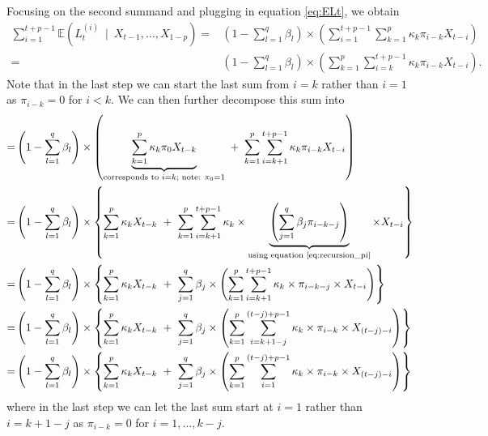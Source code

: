 \documentclass{article}
\begin{document}
Focusing on the second summand and plugging in equation \eqref{eq:ELt}, we obtain
\begin{align*}
\sum_{i = 1}^{t + p - 1}\mathbb{E}(L^{(i)}_t \ \mid \ X_{t - 1}, \dots, X_{1 - p}) = & \left(1 - \sum_{l = 1}^q \beta_l\right) \times \left( \sum_{i = 1}^{t + p - 1} \sum_{k = 1}^p \kappa_k \pi_{i - k} X_{t - i}\right)\\
= & \left(1 - \sum_{l = 1}^q \beta_l\right) \times \left(\sum_{k = 1}^p \sum_{i = k}^{t + p - 1} \kappa_k \pi_{i - k} X_{t - i}\right).
\end{align*}
Note that in the last step we can start the last sum from $i = k$ rather than $i = 1$ as $\pi_{i - k} = 0$ for $i < k$. We can then further decompose this sum into
\begin{align}
= & \left(1 - \sum_{l = 1}^q \beta_l\right) \times \left(\underbrace{\sum_{k = 1}^p \kappa_k \pi_0 X_{t - k}}_{\text{corresponds to } i = k; \text{ note: } \pi_0 = 1} \ + \ \sum_{k = 1}^p \sum_{i = k + 1}^{t + p - 1} \kappa_k \pi_{i - k} X_{t - i}\right)\nonumber\\
= & \left(1 - \sum_{l = 1}^q \beta_l\right) \times \left\{\sum_{k = 1}^p \kappa_k X_{t - k} \ + \ \sum_{k = 1}^p \sum_{i = k + 1}^{t + p - 1} \kappa_k \times \underbrace{\left(\sum_{j = 1}^q \beta_j \pi_{i - k - j}\right)}_{\text{using equation \eqref{eq:recursion_pi}}} \times X_{t - i}\right\}\nonumber\\
= & \left(1 - \sum_{l = 1}^q \beta_l\right) \times \left\{\sum_{k = 1}^p \kappa_k X_{t - k} \ + \ \sum_{j = 1}^q \beta_j \times \left(\sum_{k = 1}^p \sum_{i = k + 1}^{t + p - 1} \kappa_k \times \pi_{i - k - j} \times X_{t - i}\right)\right\}\nonumber\\
= & \left(1 - \sum_{l = 1}^q \beta_l\right) \times \left\{\sum_{k = 1}^p \kappa_k X_{t - k} \ + \ \sum_{j = 1}^q \beta_j \times \left(\sum_{k = 1}^p \sum_{i = k + 1 - j}^{(t - j) + p - 1} \kappa_k \times \pi_{i - k} \times X_{(t - j) - i}\right)\right\}\nonumber\\
= & \left(1 - \sum_{l = 1}^q \beta_l\right) \times \left\{\sum_{k = 1}^p \kappa_k X_{t - k} \ + \ \sum_{j = 1}^q \beta_j \times \left(\sum_{k = 1}^p \sum_{i = 1}^{(t - j) + p - 1} \kappa_k \times \pi_{i - k} \times X_{(t - j) - i}\right)\right\}\label{eq:substitution_ELt}
\end{align}
where in the last step we can let the last sum start at $i = 1$ rather than $i = k + 1 - j$ as $\pi_{i - k} = 0$ for $i = 1, \dots, k - j$.
\end{document}
